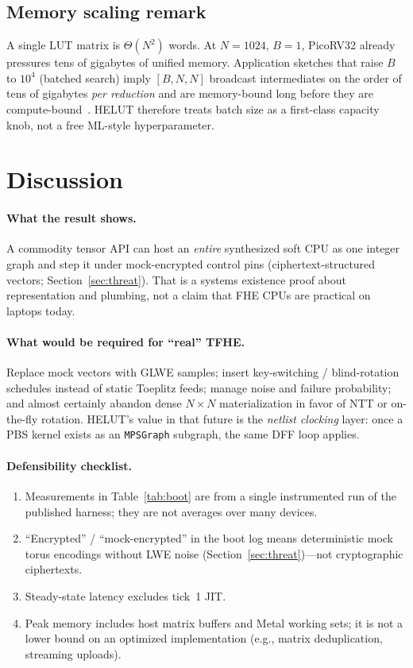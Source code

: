 \documentclass[11pt,a4paper]{article}
\begin{document}
\subsection{Memory scaling remark}

A single LUT matrix is $\Theta(N^2)$ words.
At $N=1024$, $B=1$, PicoRV32 already pressures tens of gigabytes of unified
memory.
Application sketches that raise $B$ to $10^4$ (batched search) imply
$[B,N,N]$ broadcast intermediates on the order of tens of gigabytes
\emph{per reduction} and are memory-bound long before they are
compute-bound~\cite{prd-app2}.
HELUT therefore treats batch size as a first-class capacity knob, not a free
ML-style hyperparameter.

\section{Discussion}
\label{sec:discussion}

\paragraph{What the result shows.}
A commodity tensor API can host an \emph{entire} synthesized soft CPU as one
integer graph and step it under mock-encrypted control pins
(ciphertext-structured vectors; Section~\ref{sec:threat}).
That is a systems existence proof about representation and plumbing, not a claim
that FHE CPUs are practical on laptops today.

\paragraph{What would be required for ``real'' TFHE.}
Replace mock vectors with GLWE samples; insert key-switching / blind-rotation
schedules instead of static Toeplitz feeds; manage noise and failure
probability; and almost certainly abandon dense $N\times N$ materialization in
favor of NTT or on-the-fly rotation.
HELUT's value in that future is the \emph{netlist clocking} layer: once a PBS
kernel exists as an \texttt{MPSGraph} subgraph, the same DFF loop applies.

\paragraph{Defensibility checklist.}
\begin{enumerate}[leftmargin=*,itemsep=1pt]
  \item Measurements in Table~\ref{tab:boot} are from a single instrumented run of
        the published harness; they are not averages over many devices.
  \item ``Encrypted'' / ``mock-encrypted'' in the boot log means deterministic
        mock torus encodings without LWE noise
        (Section~\ref{sec:threat})---not cryptographic ciphertexts.
  \item Steady-state latency excludes tick~1 JIT.
  \item Peak memory includes host matrix buffers and Metal working sets; it is
        not a lower bound on an optimized implementation (e.g., matrix
        deduplication, streaming uploads).
\end{enumerate}
\end{document}
